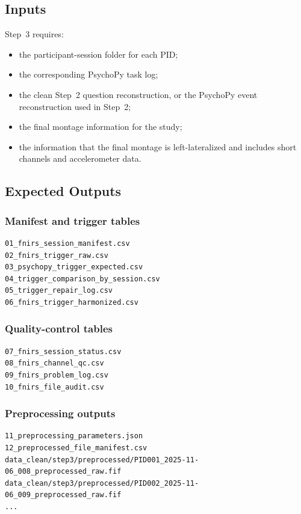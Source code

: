\documentclass[11pt]{article}
\begin{document}
\subsection{Inputs}
Step~3 requires:
\begin{itemize}
    \item the participant-session folder for each PID;
    \item the corresponding PsychoPy task log;
    \item the clean Step~2 question reconstruction, or the PsychoPy event reconstruction used in Step~2;
    \item the final montage information for the study;
    \item the information that the final montage is left-lateralized and includes short channels and accelerometer data.
\end{itemize}

\subsection{Expected Outputs}

\subsubsection*{Manifest and trigger tables}
\begin{verbatim}
01_fnirs_session_manifest.csv
02_fnirs_trigger_raw.csv
03_psychopy_trigger_expected.csv
04_trigger_comparison_by_session.csv
05_trigger_repair_log.csv
06_fnirs_trigger_harmonized.csv
\end{verbatim}

\subsubsection*{Quality-control tables}
\begin{verbatim}
07_fnirs_session_status.csv
08_fnirs_channel_qc.csv
09_fnirs_problem_log.csv
10_fnirs_file_audit.csv
\end{verbatim}

\subsubsection*{Preprocessing outputs}
\begin{verbatim}
11_preprocessing_parameters.json
12_preprocessed_file_manifest.csv
data_clean/step3/preprocessed/PID001_2025-11-06_008_preprocessed_raw.fif
data_clean/step3/preprocessed/PID002_2025-11-06_009_preprocessed_raw.fif
...
\end{verbatim}
\end{document}

